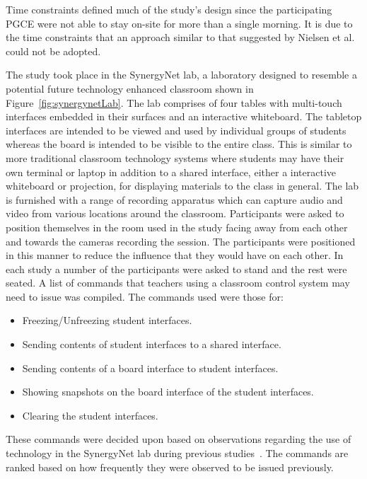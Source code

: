 \documentclass[manuscript, review, screen]{acmart}
\begin{document}
Time constraints defined much of the study's design since the participating \ac{PGCE} were not able to stay on-site for more than a single morning.
It is due to the time constraints that an approach similar to that suggested by Nielsen et al.~\citeyearpar{Nielsen2004} could not be adopted.

The study took place in the SynergyNet lab, a laboratory designed to resemble a potential future technology enhanced classroom shown in Figure~\ref{fig:synergynetLab}.
The lab comprises of four tables with multi-touch interfaces embedded in their surfaces and an interactive whiteboard. 
The tabletop interfaces are intended to be viewed and used by individual groups of students whereas the board is intended to be visible to the entire class.
This is similar to more traditional classroom technology systems where students may have their own terminal or laptop in addition to a shared interface, either a interactive whiteboard or projection, for displaying materials to the class in general.
The lab is furnished with a range of recording apparatus which can capture audio and video from various locations around the classroom.
Participants were asked to position themselves in the room used in the study facing away from each other and towards the cameras recording the session.
The participants were positioned in this manner to reduce the influence that they would have on each other.
In each study a number of the participants were asked to stand and the rest were seated.
A list of commands that teachers using a classroom control system may need to issue was compiled.
The commands used were those for: 
\begin{itemize}
\item Freezing/Unfreezing student interfaces.
\item Sending contents of student interfaces to a shared interface.
\item Sending contents of a board interface to student interfaces.
\item Showing snapshots on the board interface of the student interfaces.
\item Clearing the student interfaces.\\
\end{itemize}

These commands were decided upon based on observations regarding the use of technology in the SynergyNet lab during previous studies~\cite{Hatch2011}.
The commands are ranked based on how frequently they were observed to be issued previously.
\end{document}
